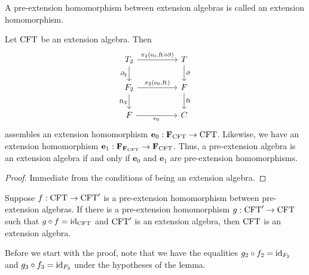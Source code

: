 \begin{defn}
A pre-extension homomorphism between extension algebras is called an extension
homomorphism.
\end{defn}

\begin{lem}
Let $\mathrm{CFT}$ be an extension algebra. Then
\begin{equation*}
\begin{tikzcd}[column sep=huge]
\stesyst_2
  \ar{r}{\pullbackpr{2}{\ectxext}{\eft\circ\ebd}}
  \ar{d}[swap]{\ebd[2]}
  &
\stesyst
  \ar{d}{\ebd}
  \\
\stesysf_2
  \ar{r}{\pullbackpr{2}{\ectxext}{\eft}}
  \ar{d}[swap]{\eft[2]}
  &
\stesysf
  \ar{d}{\eft}
  \\
\stesysf
  \ar{r}[swap]{\ectxext}
  &
\stesysc
\end{tikzcd}
\end{equation*}
assembles an extension homomorphism $\mathbf{e}_0:\mathbf{F}_{\mathrm{CFT}}\to\mathrm{CFT}$.
Likewise, we have an extension homomorphism
$\mathbf{e}_1:\mathbf{F}_{\mathbf{F}_{\mathrm{CFT}}}\to\mathbf{F}_{\mathrm{CFT}}$. Thus, a
pre-extension algebra is an extension algebra if and only if $\mathbf{e}_0$
and $\mathbf{e}_1$ are pre-extension homomorphisms.
\end{lem}

\begin{proof}
Immediate from the conditions of being an extension algebra.
\end{proof}

\begin{lem}\label{esys-retract}
Suppose $f:\mathrm{CFT}\to\mathrm{CFT}'$ is a pre-extension homomorphism between
pre-extension algebras. If there is a pre-extension homomorphism $g:\mathrm{CFT}'\to
\mathrm{CFT}$ such that $g\circ f={\mathrm{id}_{\mathrm{CFT}}}$ and $\mathrm{CFT}'$ is an extension
algebra, then $\mathrm{CFT}$ is an extension algebra.
\end{lem}

Before we start with the proof, note that we have the equalities
$g_2\circ f_2={\mathrm{id}_{F_2}}$ and $g_3\circ f_3={\mathrm{id}_{F_3}}$
under the hypotheses of the lemma.


